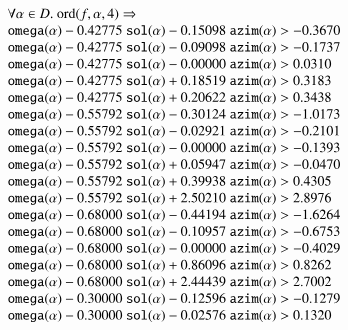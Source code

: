$$
\begin{array}{lll}
\leftalign\\
\forall\alpha\in D. \ \op{ord}(f,\alpha,4) \Rightarrow \\
   \optt{omega}(\alpha) - 0.42775\ \optt{sol}(\alpha) - 0.15098\ \optt{azim}(\alpha) > -0.3670\\
   \optt{omega}(\alpha) - 0.42775\ \optt{sol}(\alpha) - 0.09098\ \optt{azim}(\alpha) > -0.1737\\
   \optt{omega}(\alpha) - 0.42775\ \optt{sol}(\alpha) - 0.00000\ \optt{azim}(\alpha) > 0.0310\\
   \optt{omega}(\alpha) - 0.42775\ \optt{sol}(\alpha) + 0.18519\ \optt{azim}(\alpha) > 0.3183\\
   \optt{omega}(\alpha) - 0.42775\ \optt{sol}(\alpha) + 0.20622\ \optt{azim}(\alpha) > 0.3438\\
   \optt{omega}(\alpha) - 0.55792\ \optt{sol}(\alpha) - 0.30124\ \optt{azim}(\alpha) > -1.0173\\
   \optt{omega}(\alpha) - 0.55792\ \optt{sol}(\alpha) - 0.02921\ \optt{azim}(\alpha) > -0.2101\\
   \optt{omega}(\alpha) - 0.55792\ \optt{sol}(\alpha) - 0.00000\ \optt{azim}(\alpha) > -0.1393\\
   \optt{omega}(\alpha) - 0.55792\ \optt{sol}(\alpha) + 0.05947\ \optt{azim}(\alpha) > -0.0470\\
   \optt{omega}(\alpha) - 0.55792\ \optt{sol}(\alpha) + 0.39938\ \optt{azim}(\alpha) > 0.4305\\
   \optt{omega}(\alpha) - 0.55792\ \optt{sol}(\alpha) + 2.50210\ \optt{azim}(\alpha) > 2.8976\\
   \optt{omega}(\alpha) - 0.68000\ \optt{sol}(\alpha) - 0.44194\ \optt{azim}(\alpha) > -1.6264\\
   \optt{omega}(\alpha) - 0.68000\ \optt{sol}(\alpha) - 0.10957\ \optt{azim}(\alpha) > -0.6753\\
   \optt{omega}(\alpha) - 0.68000\ \optt{sol}(\alpha) - 0.00000\ \optt{azim}(\alpha) > -0.4029\\
   \optt{omega}(\alpha) - 0.68000\ \optt{sol}(\alpha) + 0.86096\ \optt{azim}(\alpha) > 0.8262\\
   \optt{omega}(\alpha) - 0.68000\ \optt{sol}(\alpha) + 2.44439\ \optt{azim}(\alpha) > 2.7002\\
   \optt{omega}(\alpha) - 0.30000\ \optt{sol}(\alpha) - 0.12596\ \optt{azim}(\alpha) > -0.1279\\
   \optt{omega}(\alpha) - 0.30000\ \optt{sol}(\alpha) - 0.02576\ \optt{azim}(\alpha) > 0.1320\\

\end{array}$$
